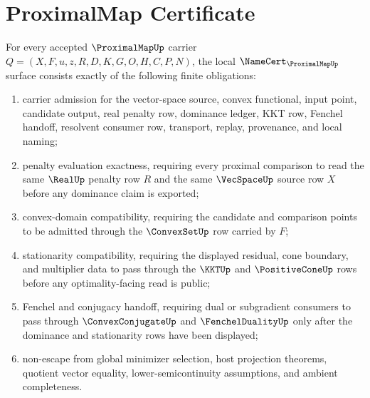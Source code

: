 \section{ProximalMap Certificate}
\label{sec:proximal-map-certificate}

\begin{theorem}
\label{thm:proximal-map-namecert-obligations}
For every accepted $\ProximalMapUp$ carrier $Q=(X,F,u,z,R,D,K,G,O,H,C,P,N)$, the local $\NameCert_{\ProximalMapUp}$ surface consists exactly of the following finite obligations:
\begin{enumerate}
\item carrier admission for the vector-space source, convex functional, input point, candidate output, real penalty row, dominance ledger, KKT row, Fenchel handoff, resolvent consumer row, transport, replay, provenance, and local naming;
\item penalty evaluation exactness, requiring every proximal comparison to read the same $\RealUp$ penalty row $R$ and the same $\VecSpaceUp$ source row $X$ before any dominance claim is exported;
\item convex-domain compatibility, requiring the candidate and comparison points to be admitted through the $\ConvexSetUp$ row carried by $F$;
\item stationarity compatibility, requiring the displayed residual, cone boundary, and multiplier data to pass through the $\KKTUp$ and $\PositiveConeUp$ rows before any optimality-facing read is public;
\item Fenchel and conjugacy handoff, requiring dual or subgradient consumers to pass through $\ConvexConjugateUp$ and $\FenchelDualityUp$ only after the dominance and stationarity rows have been displayed;
\item non-escape from global minimizer selection, host projection theorems, quotient vector equality, lower-semicontinuity assumptions, and ambient completeness.
\end{enumerate}
\end{theorem}
